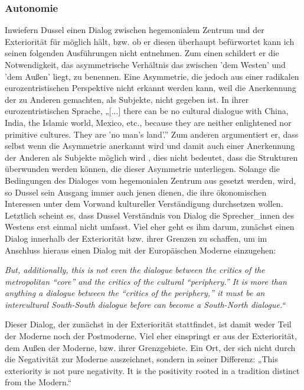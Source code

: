 \subsubsection{Autonomie}

Inwiefern Dussel einen Dialog zwischen hegemonialem Zentrum und der Exteriorität
für möglich hält, bzw. ob er diesen überhaupt befürwortet kann ich seinen
folgenden Ausführungen nicht entnehmen. Zum einen schildert er die
Notwendigkeit, das asymmetrische Verhältnis das zwischen 'dem Westen' und 'dem
Außen' liegt, zu benennen. Eine Asymmetrie, die jedoch aus einer radikalen
eurozentristischen Perspektive nicht erkannt werden kann, weil die Anerkennung
der zu Anderen gemachten, als Subjekte, nicht gegeben ist. In ihrer
eurozentristischen Sprache,  „[...] there can be no cultural dialogue with
China, India, the Islamic world, Mexico, etc., because they are neither
enlightened nor primitive cultures. They are 'no man's land'.”\footnotemark
{} Zum anderen argumentiert er, dass selbst wenn die
Asymmetrie anerkannt wird und damit auch einer Anerkennung der Anderen als
Subjekte möglich wird , dies nicht bedeutet, dass die Strukturen überwunden
werden können, die dieser Asymmetrie unterliegen. Solange die Bedingungen des
Dialoges vom hegemonialen Zentrum aus gesetzt werden, wird, so Dussel sein
Ausgang immer auch jenen dienen, die ihre ökonomischen Interessen unter dem
Vorwand kultureller Verständigung durchsetzen wollen.\footnotemark
{} Letztlich scheint es, dass Dussel Verständnis von Dialog die
Sprecher\_innen des Westens erst einmal nicht umfasst. Viel eher geht es ihm
darum, zunächst einen Dialog innerhalb der Exteriorität bzw. ihrer Grenzen zu
schaffen, um im Anschluss hieraus einen Dialog mit der Europäischen Moderne
einzugehen:
\begin{myenv}
    \textit{But, additionally, this is not even the dialogue between the critics of the metropolitan “core” and the critics of the cultural “periphery.” It is more than anything a dialogue between the “critics of the periphery,” it must be an intercultural South-South dialogue before can become a South-North dialogue.“\footnotemark {}}
\end{myenv}

Dieser Dialog, der zunächst in der Exteriorität stattfindet, ist damit weder
Teil der Moderne noch der Postmoderne. Viel eher einspringt er aus der
Exteriorität, dem Außen der Moderne, bzw. ihrer Grenzgebiete. Ein Ort, der sich
nicht durch die Negativität zur Moderne auszeichnet, sondern in seiner
Differenz: „This exteriority is not pure negativity. It is the positivity rooted
in a tradition distinct from the Modern.“\footnotemark {}

